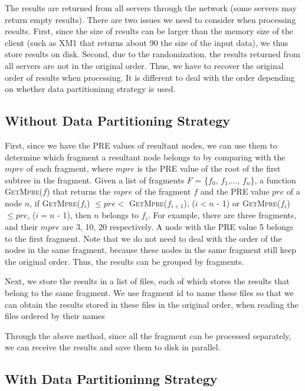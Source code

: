The results are returned from all servers through the network (some servers may
return empty results). There are two issues we need to consider when processing
results. First, since the size of results can be larger than the memory size of
the client (such as XM1 that returns about 90 the size of the input data), we
thus store results on disk. Second, due to the randomization, the results
returned from all servers are not in the original order. Thus, we have to
recover the original order of results when processing. It is different to deal
with the order depending on whether data partitioninng strategy is used.

\subsection{Without Data Partitioning Strategy}

First, since we have the PRE values of resultant nodes, we can use them to
determine which fragment a resultant node belongs to by comparing with the
$mpre$ of each fragment, where $mpre$ is the PRE value of the root of the first
subtree in the fragment. Given a list of fragments $F$ = \{$f_0$, $f_1$,...,
$f_n$\}, a function \textsc{GetMpre($f$)} that returns the $mpre$ of the
fragment $f$ and the PRE value $pre$ of a node $n$, if \textsc{GetMpre($f_i$)}
$\leq pre <$ \textsc{GetMpre($f_{i+1}$)}, ($i  < n$ - 1) or
\textsc{GetMpre($f_i$)}$\leq pre$, ($i = n$ - 1), then $n$ belongs to $f_i$. For
example, there are three fragments, and their $mpre$ are 3, 10, 20 respectively.
A node with the PRE value 5 belongs to the first fragment. Note that we do not
need to deal with the order of the nodes in the same fragment, because these
nodes in the same fragment still keep the original order. Thus, the results can
be grouped by fragments.

Next, we store the results in a list of files, each of which stores the results
that belong to the same fragment. We use fragment id to name these files so
that we can obtain the results stored in these files in the original order, when
reading the files ordered by their names

Through the above method, since all the fragment can be processed separately, we
can receive the results and save them to disk in parallel.

\subsection{With Data Partitioninng Strategy}

